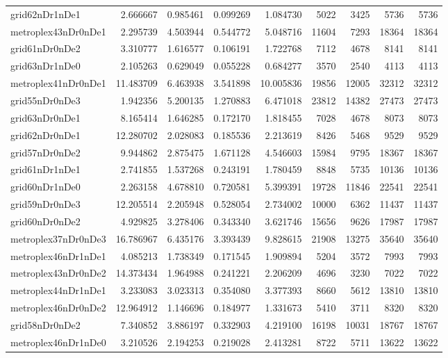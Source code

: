 \begin{longtable}{|l|r|r|r|r|r|r|r|r|}
grid62nDr1nDe1 & 2.666667 & 0.985461 & 0.099269 & 1.084730 & 5022 & 3425 & 5736 & 5736 \\
metroplex43nDr0nDe1 & 2.295739 & 4.503944 & 0.544772 & 5.048716 & 11604 & 7293 & 18364 & 18364 \\
grid61nDr0nDe2 & 3.310777 & 1.616577 & 0.106191 & 1.722768 & 7112 & 4678 & 8141 & 8141 \\
grid63nDr1nDe0 & 2.105263 & 0.629049 & 0.055228 & 0.684277 & 3570 & 2540 & 4113 & 4113 \\
metroplex41nDr0nDe1 & 11.483709 & 6.463938 & 3.541898 & 10.005836 & 19856 & 12005 & 32312 & 32312 \\
grid55nDr0nDe3 & 1.942356 & 5.200135 & 1.270883 & 6.471018 & 23812 & 14382 & 27473 & 27473 \\
grid63nDr0nDe1 & 8.165414 & 1.646285 & 0.172170 & 1.818455 & 7028 & 4678 & 8073 & 8073 \\
grid62nDr0nDe1 & 12.280702 & 2.028083 & 0.185536 & 2.213619 & 8426 & 5468 & 9529 & 9529 \\
grid57nDr0nDe2 & 9.944862 & 2.875475 & 1.671128 & 4.546603 & 15984 & 9795 & 18367 & 18367 \\
grid61nDr1nDe1 & 2.741855 & 1.537268 & 0.243191 & 1.780459 & 8848 & 5735 & 10136 & 10136 \\
grid60nDr1nDe0 & 2.263158 & 4.678810 & 0.720581 & 5.399391 & 19728 & 11846 & 22541 & 22541 \\
grid59nDr0nDe3 & 12.205514 & 2.205948 & 0.528054 & 2.734002 & 10000 & 6362 & 11437 & 11437 \\
grid60nDr0nDe2 & 4.929825 & 3.278406 & 0.343340 & 3.621746 & 15656 & 9626 & 17987 & 17987 \\
metroplex37nDr0nDe3 & 16.786967 & 6.435176 & 3.393439 & 9.828615 & 21908 & 13275 & 35640 & 35640 \\
metroplex46nDr1nDe1 & 4.085213 & 1.738349 & 0.171545 & 1.909894 & 5204 & 3572 & 7993 & 7993 \\
metroplex43nDr0nDe2 & 14.373434 & 1.964988 & 0.241221 & 2.206209 & 4696 & 3230 & 7022 & 7022 \\
metroplex44nDr1nDe1 & 3.233083 & 3.023313 & 0.354080 & 3.377393 & 8660 & 5612 & 13810 & 13810 \\
metroplex46nDr0nDe2 & 12.964912 & 1.146696 & 0.184977 & 1.331673 & 5410 & 3711 & 8320 & 8320 \\
grid58nDr0nDe2 & 7.340852 & 3.886197 & 0.332903 & 4.219100 & 16198 & 10031 & 18767 & 18767 \\
metroplex46nDr1nDe0 & 3.210526 & 2.194253 & 0.219028 & 2.413281 & 8722 & 5711 & 13622 & 13622 \\

\end{longtable}
